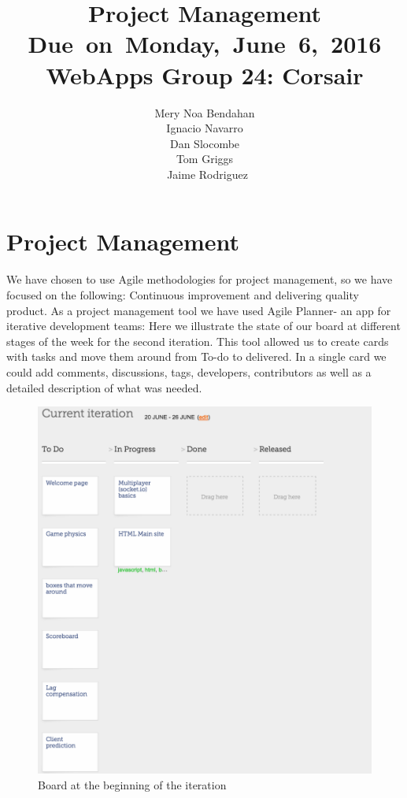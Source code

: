 \documentclass{article}
\title{
\vspace{2in}
\textmd{\textbf{Project Management}}\\
\normalsize\vspace{0.1in}\small{Due\ on\ Monday,\ June\ 6,\ 2016}\\
\vspace{0.1in}\large{\textbf{WebApps Group 24: Corsair}}
\vspace{3in}
}
\author{Mery Noa Bendahan \\ Ignacio Navarro \\ Dan Slocombe \\ Tom Griggs \\ Jaime Rodriguez}
\date{}
\renewcommand{\_}{\char`_}
\begin{document}
\section{Project Management}
We have chosen to use Agile methodologies for project management, so we have focused on the following: Continuous improvement and delivering quality product. As a project management tool we have used Agile Planner- an app for iterative development teams: Here we illustrate the state of our board at different stages of the week for the second iteration.
This tool allowed us to create cards with tasks and move them around from To-do to delivered. In a single card we could add comments, discussions, tags, developers, contributors as well as a detailed description of what was needed.

\begin{figure}[ht] 
  \label{ fig7} 
  \begin{minipage}[b]{0.5\linewidth}
    \centering
    \includegraphics[width=.8\linewidth]{beginning} 
    \caption{Board at the beginning of the iteration} 
    \vspace{4ex}
  \end{minipage}%
  \begin{minipage}[b]{0.5\linewidth}
    \centering

\end{minipage}
\end{figure}
\end{document}
